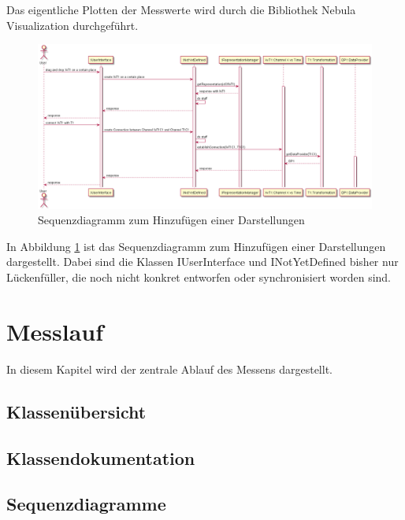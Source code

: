 \documentclass[parskip=full]{scrartcl}
\begin{document}
Das eigentliche Plotten der Messwerte wird durch die Bibliothek \gls{Nebula Visualization} durchgeführt. 

\begin{figure}[htbp]
	\begin{center}
		\includegraphics[width = 16cm]{Grafik/SequenceAddRepresentation.png}
		\caption{Sequenzdiagramm zum Hinzufügen einer Darstellungen}
		\label{SequenceAddRepresentation}
	\end{center}
\end{figure}

In Abbildung \ref{SequenceAddRepresentation} ist das Sequenzdiagramm zum Hinzufügen einer Darstellungen dargestellt. Dabei sind die Klassen IUserInterface und INotYetDefined bisher nur Lückenfüller, die noch nicht konkret entworfen oder synchronisiert worden sind. 



\clearpage
\section{Messlauf}

In diesem Kapitel wird der zentrale Ablauf des Messens dargestellt.

\subsection{Klassenübersicht}


\subsection{Klassendokumentation}


\subsection{Sequenzdiagramme}
\end{document}
